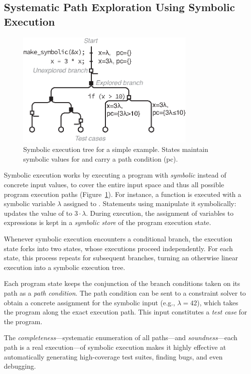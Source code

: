 \subsection{Systematic Path Exploration Using Symbolic Execution}

\begin{figure}
  \centering
  \includegraphics[width=3.5in]{figures/intro/symbex-tree}
  \caption{Symbolic execution tree for a simple example.  States maintain symbolic values for  and carry a path condition (pc).}
  \label{fig:intro:symbex-tree}
\end{figure}

Symbolic execution works by executing a program with \emph{symbolic} instead of concrete input values, to cover the entire input space and thus all possible program execution paths (Figure~\ref{fig:intro:symbex-tree}).  For instance, a function  is executed with a symbolic variable $\lambda$ assigned to .
%
Statements using  manipulate it symbolically:  updates the value of  to $3 \cdot \lambda$.  During execution, the assignment of variables to expressions is kept in a \emph{symbolic store} of the program execution state.

Whenever symbolic execution encounters a conditional branch, the execution state forks into two states, whose executions proceed independently.  For each state, this process repeats for subsequent branches, turning an otherwise linear execution into a symbolic execution tree.

Each program state keeps the conjunction of the branch conditions taken on its path as a \emph{path condition}.
%
The path condition can be sent to a constraint solver to obtain a concrete assignment for the symbolic input (e.g., $\lambda = 42$), which takes the program along the exact execution path.  This input constitutes a \emph{test case} for the program.

The \emph{completeness}---systematic enumeration of all paths---and \emph{soundness}---each path is a real execution---of symbolic execution makes it highly effective at automatically generating high-coverage test suites, finding bugs, and even debugging.


